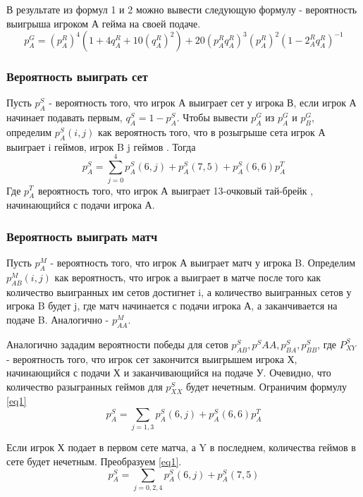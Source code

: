 В результате из формул 1 и 2 можно вывести следующую формулу -  вероятность выигрыша игроком А гейма на своей подаче.
\begin{equation}
p_A^{G} = (p^R_A)^4(1 + 4q^R_A + 10(q^R_A)^2) + 20(p^R_Aq^R_A)^3(p_A^R)^2(1 - 2_A^Rq^R_A)^{-1}
\end{equation} 

\subsubsection{Вероятность выиграть сет}
Пусть $p_A^S$ - вероятность того, что игрок А выиграет сет у игрока В, если игрок А начинает подавать первым, $q_A^S=1 - p^S_A$. Чтобы вывести $p^G_A$ из $p^G_A$ и $p^G_B$, определим $p_A^S(i,j)$ как вероятность того, что в розыгрыше сета игрок А выиграет i геймов, игрок B j геймов . Тогда
\begin{equation}
p_A^S=\sum\limits^{4}_{j=0}{p_A^S(6,j)} + p^S_A(7,5) + p^S_A(6,6)p^T_A\label{eq1}
\end{equation}
Где $p^T_A$  вероятность того, что игрок А выиграет 13-очковый тай-брейк , начинающийся с подачи игрока А.
\subsubsection{Вероятность выиграть матч}
Пусть $p^M_A$ - вероятность того, что игрок А выиграет матч у игрока B. Определим $p_{AB}^M(i,j)$ как вероятность, что игрок а выиграет в матче после того как количество выигранных им сетов достигнет i, а количество выигранных сетов у игрока B будет j, где матч начинается с подачи игрока А, а заканчивается на подаче B. Аналогично - $p^M_{AA}$.

Аналогично зададим вероятности победы для сетов $p^S_{AB}, p^S{AA}, p^S_{BA}, p^S_{BB}$, где $P^S_{XY}$ - вероятность того, что игрок сет закончится выигрышем игрока Х, начинающийся с подачи Х и заканчивающийся на подаче У.
Очевидно, что количество разыгранных геймов для $p^S_{XX}$ будет нечетным. Ограничим формулу \eqref{eq1}
\begin{equation}
p_A^S=\sum\limits_{j=1,3}{p_A^S(6,j)}  + p^S_A(6,6)p^T_A
\end{equation}

Если игрок Х подает в первом сете матча, а Y в последнем, количества геймов в сете будет нечетным.
Преобразуем \eqref{eq1}.
\begin{equation}
p_A^S=\sum\limits_{j=0,2,4}{p_A^S(6,j)} + p^S_A(7,5) 
\end{equation}

